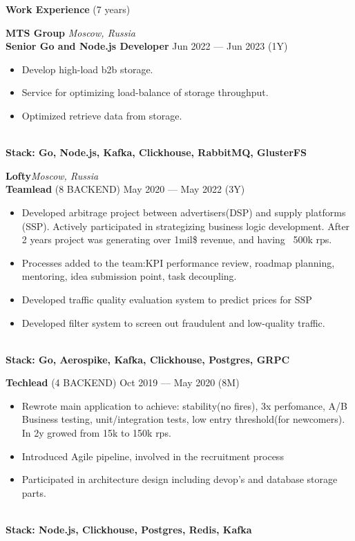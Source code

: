\documentclass{resume} %
\begin{document}
\begin{rSection}{\textbf{Work Experience} (7 years) }

\textbf{MTS Group} \hfill \textit{Moscow, Russia} \\
\textbf{Senior Go and Node.js Developer}  \hfill Jun 2022 --- Jun 2023 (1Y)
\begin{itemize}
    \setlength\itemsep{-0.4em}
    \item Develop high-load b2b storage.
    \item Service for optimizing load-balance of storage throughput.
    \item Optimized retrieve data from storage.
\end{itemize}
\\\textbf{Stack: Go, Node.js, Kafka, Clickhouse, RabbitMQ, GlusterFS}

\textbf{Lofty}\hfill \textit{Moscow, Russia} \\
\textbf{Teamlead} (8 BACKEND) \hfill May 2020 --- May 2022 (3Y)
\begin{itemize}
    \setlength\itemsep{-0.4em}
    \item Developed arbitrage project between advertisers(DSP) and supply platforms (SSP). Actively participated in strategizing
    	   business logic development.
    	   After 2 years project was generating over 1mil\$ revenue, and having ~500k rps.
    \item Processes added to the team:KPI performance review, roadmap planning, mentoring, idea submission point, task decoupling.
    \item Developed traffic quality evaluation system to predict prices for SSP
    \item Developed filter system to screen out fraudulent and low-quality traffic.
\end{itemize}
\\\textbf{Stack: Go, Aerospike, Kafka, Clickhouse, Postgres, GRPC}

\textbf{Techlead} (4 BACKEND) \hfill Oct 2019 --- May 2020 (8M)
\begin{itemize}
    \setlength\itemsep{-0.4em}
    \item Rewrote main application to achieve: stability(no fires), 3x perfomance, A/B Business testing, unit/integration tests, low
    	    entry threshold(for newcomers).
    	    In 2y growed from 15k to 150k rps.
    \item Introduced Agile pipeline, involved in the recruitment process
    \item Participated in architecture design including devop's and database storage parts.
\end{itemize}
\\\textbf{Stack: Node.js, Clickhouse, Postgres, Redis, Kafka}


\end{rSection}
\end{document}

